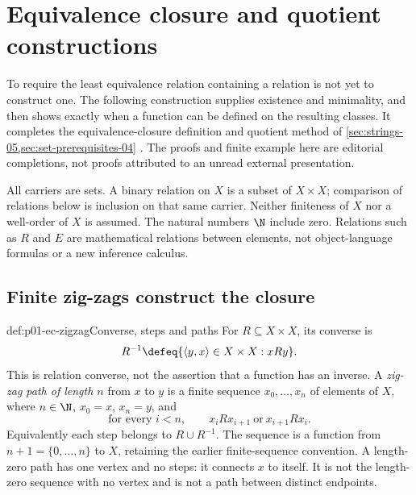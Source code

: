 \section{Equivalence closure and quotient constructions}
\label{sec:p01-equivalence-closure-and-quotients}

To require the least equivalence relation containing a relation is not yet
to construct one. The following construction supplies existence and
minimality, and then shows exactly when a function can be defined on the
resulting classes. It completes the equivalence-closure definition and
quotient method of \cref{sec:strings-05,sec:set-prerequisites-04}
\cite[sections ``Relations and closures'' and ``Equivalence relations and
quotients'']{FrozenFormalLogicFoundationsClosure}.
The proofs and finite example here are editorial completions, not proofs
attributed to an unread external presentation.

All carriers are sets. A binary relation on \(X\) is a subset of
\(X\times X\); comparison of relations below is inclusion on that same
carrier. Neither finiteness of \(X\) nor a well-order of \(X\) is assumed.
The natural numbers \(\N\) include zero. Relations such as \(R\) and
\(E\) are mathematical relations between elements, not object-language
formulas or a new inference calculus.

\subsection{Finite zig-zags construct the closure}

\begin{hbdefinition}{def:p01-ec-zigzag}{Converse, steps and paths}
For \(R\subseteq X\times X\), its converse is
\[
 R^{-1}\defeq\{\langle y,x\rangle\in X\times X:xRy\}.
\]
This is relation converse, not the assertion that a function has an inverse.
A \emph{zig-zag path of length \(n\)} from \(x\) to \(y\) is a
finite sequence \(x_0,\ldots,x_n\) of elements of \(X\), where
\(n\in\N\), \(x_0=x\), \(x_n=y\), and
\[
 \text{for every }i<n,\qquad x_iRx_{i+1}\ \text{or}\ x_{i+1}Rx_i.
\]
Equivalently each step belongs to \(R\cup R^{-1}\). The sequence is a
function from \(n+1=\{0,\ldots,n\}\) to \(X\), retaining the earlier
finite-sequence convention. A length-zero path has one vertex and no
steps: it connects \(x\) to itself. It is not the length-zero sequence
with no vertex and is not a path between distinct endpoints.
\end{hbdefinition}

